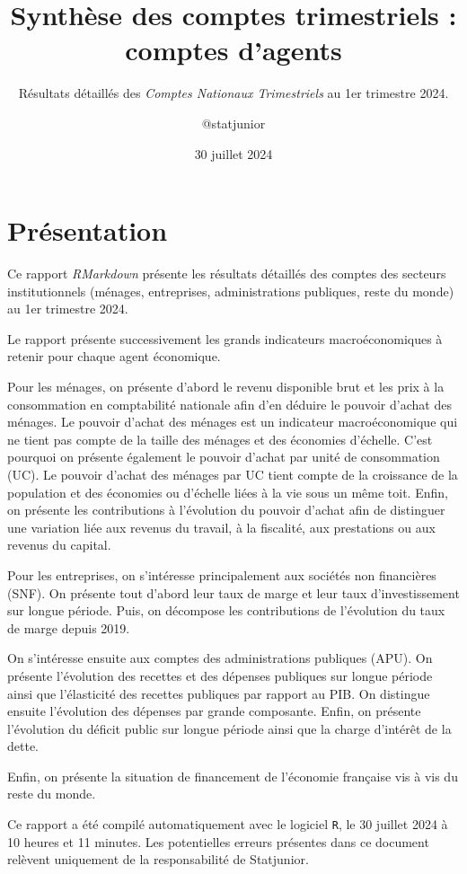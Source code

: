 \documentclass[
]{article}
\title{Synthèse des comptes trimestriels : comptes d'agents}
\subtitle{Résultats détaillés des \emph{Comptes Nationaux Trimestriels}
au 1er trimestre 2024.}
\author{@statjunior}
\date{30 juillet 2024}
\begin{document}
\maketitle

\section{Présentation}\label{pruxe9sentation}

Ce rapport \emph{RMarkdown} présente les résultats détaillés des comptes
des secteurs institutionnels (ménages, entreprises, administrations
publiques, reste du monde) au 1er trimestre 2024.

Le rapport présente successivement les grands indicateurs
macroéconomiques à retenir pour chaque agent économique.

Pour les ménages, on présente d'abord le revenu disponible brut et les
prix à la consommation en comptabilité nationale afin d'en déduire le
pouvoir d'achat des ménages. Le pouvoir d'achat des ménages est un
indicateur macroéconomique qui ne tient pas compte de la taille des
ménages et des économies d'échelle. C'est pourquoi on présente également
le pouvoir d'achat par unité de consommation (UC). Le pouvoir d'achat
des ménages par UC tient compte de la croissance de la population et des
économies ou d'échelle liées à la vie sous un même toit. Enfin, on
présente les contributions à l'évolution du pouvoir d'achat afin de
distinguer une variation liée aux revenus du travail, à la fiscalité,
aux prestations ou aux revenus du capital.

Pour les entreprises, on s'intéresse principalement aux sociétés non
financières (SNF). On présente tout d'abord leur taux de marge et leur
taux d'investissement sur longue période. Puis, on décompose les
contributions de l'évolution du taux de marge depuis 2019.

On s'intéresse ensuite aux comptes des administrations publiques (APU).
On présente l'évolution des recettes et des dépenses publiques sur
longue période ainsi que l'élasticité des recettes publiques par rapport
au PIB. On distingue ensuite l'évolution des dépenses par grande
composante. Enfin, on présente l'évolution du déficit public sur longue
période ainsi que la charge d'intérêt de la dette.

Enfin, on présente la situation de financement de l'économie française
vis à vis du reste du monde.

Ce rapport a été compilé automatiquement avec le logiciel \texttt{R}, le
30 juillet 2024 à 10 heures et 11 minutes. Les potentielles erreurs
présentes dans ce document relèvent uniquement de la responsabilité de
Statjunior.
\end{document}
